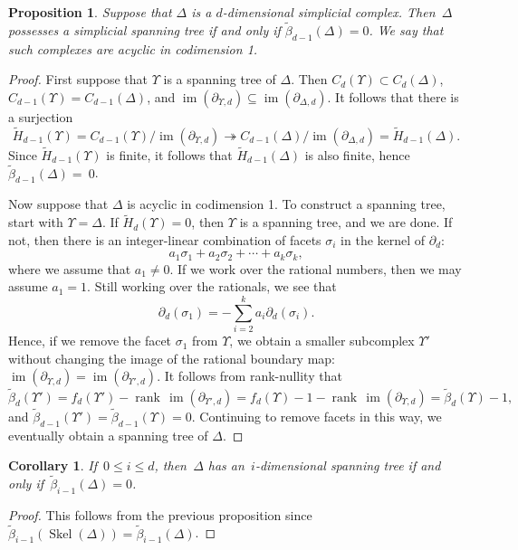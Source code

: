 \documentclass[12pt]{article}
\newcommand{\tH}{\widetilde{H}}
\newcommand{\tb}{\tilde{\beta}}
\DeclareMathOperator{\rk}{\mathrm{rank}}
\DeclareMathOperator{\im}{\mathrm{im}}
\DeclareMathOperator{\skel}{Skel}
\newtheorem{cor}[theorem]{Corollary}
\newtheorem{prop}[theorem]{Proposition}
\theoremstyle{definition}
\theoremstyle{remark}
\begin{document}
\begin{prop}\label{prop: AC1}
Suppose that $\Delta$ is a $d$-dimensional simplicial complex. Then~$\Delta$ possesses a simplicial spanning tree if and only if $\tb_{d-1}(\Delta)=0$. We say that such complexes are \emph{acyclic in codimension 1}.
\end{prop}
\begin{proof}
First suppose that $\Upsilon$ is a spanning tree of $\Delta$. Then $C_d(\Upsilon)\subset C_d(\Delta)$, $C_{d-1}(\Upsilon)=C_{d-1}(\Delta)$, and $\im(\partial_{\Upsilon,d})\subseteq\im(\partial_{\Delta,d})$. It follows that there is a surjection
\[
\tH_{d-1}(\Upsilon)=C_{d-1}(\Upsilon)/\im(\partial_{\Upsilon,d})\twoheadrightarrow 
C_{d-1}(\Delta)/\im(\partial_{\Delta,d})=\tH_{d-1}(\Delta).
\]
Since $\tH_{d-1}(\Upsilon)$ is finite, it follows that $\tH_{d-1}(\Delta)$ is also finite, hence $\tb_{d-1}(\Delta)=~0$.

Now suppose that $\Delta$ is acyclic in codimension 1. To construct a spanning tree, start with $\Upsilon=\Delta$. If $\tH_d(\Upsilon)=0$, then $\Upsilon$ is a spanning tree, and we are done. If not, then there is an integer-linear combination of facets $\sigma_i$ in the kernel of $\partial_d$:
\[
a_1\sigma_1+a_2\sigma_2+\cdots+a_k\sigma_k,
\]
where we assume that $a_1\ne 0$. If we work over the rational numbers, then we may assume $a_1=1$. Still working over the rationals, we see that 
\[
\partial_d(\sigma_1)=-\sum_{i=2}^ka_i\partial_d(\sigma_i).
\]
Hence, if we remove the facet $\sigma_1$ from $\Upsilon$, we obtain a smaller subcomplex $\Upsilon'$ without changing the image of the rational boundary map: $\im(\partial_{\Upsilon,d})=\im(\partial_{\Upsilon',d})$. It follows from rank-nullity that
\[
\tb_d(\Upsilon')=f_d(\Upsilon')-\rk\,\im(\partial_{\Upsilon',d})=f_d(\Upsilon)-1-\rk\,\im(\partial_{\Upsilon,d})
=\tb_d(\Upsilon)-1,
\]
and $\tb_{d-1}(\Upsilon')=\tb_{d-1}(\Upsilon)=0$. Continuing to remove facets in this way, we eventually obtain a spanning tree of $\Delta$.
\end{proof}

\begin{cor}\label{cor: AC1} If~$0\leq i\leq d$, then~$\Delta$ has
  an~$i$-dimensional spanning tree if and only if~$\tb_{i-1}(\Delta)=0$.
\end{cor}
\begin{proof} This follows from the previous proposition
  since~$\tb_{i-1}(\skel(\Delta))=\tb_{i-1}(\Delta)$.
\end{proof}
\end{document}
